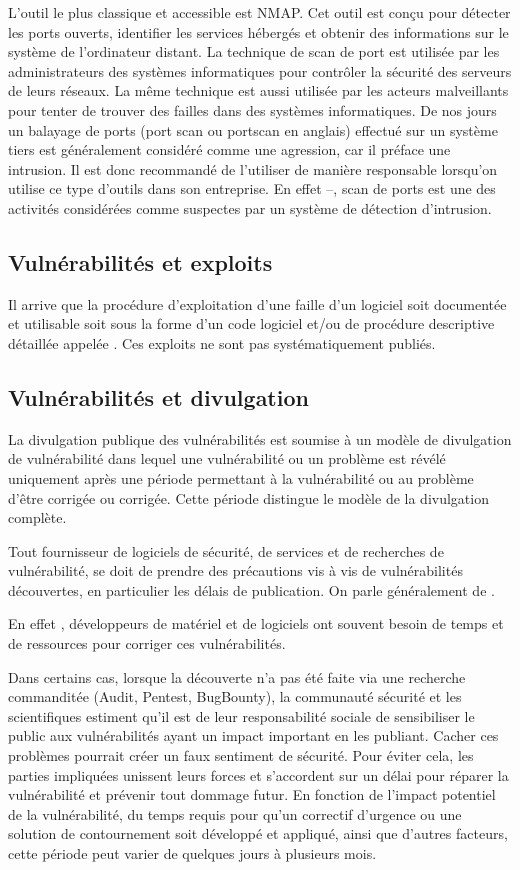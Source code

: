 L'outil le plus classique et accessible est NMAP.  Cet outil est conçu pour détecter les ports ouverts, identifier les services hébergés et obtenir des informations sur le système  de l'ordinateur distant. 
La technique de scan de port est utilisée par les administrateurs des systèmes informatiques pour contrôler la sécurité des serveurs de leurs réseaux. La même technique est aussi utilisée par les acteurs malveillants pour tenter de trouver des failles dans des systèmes informatiques. De nos jours un balayage de ports (port scan ou portscan en anglais) effectué sur un système tiers est généralement considéré comme une agression, car il préface une intrusion. Il est donc recommandé de l'utiliser de manière responsable lorsqu'on utilise ce type d'outils dans son entreprise. En effet --, 
scan de ports est une des activités considérées comme suspectes par un système de détection d'intrusion. 

\subsection{Vulnérabilités et exploits}

Il arrive que la procédure d'exploitation d'une faille d'un logiciel soit  documentée et utilisable soit sous la forme d'un code logiciel et/ou de procédure descriptive détaillée appelée . Ces exploits ne sont pas systématiquement publiés.

\subsection{Vulnérabilités et divulgation}

 La divulgation publique des vulnérabilités  est soumise à un modèle de divulgation de vulnérabilité dans lequel une vulnérabilité ou un problème est révélé uniquement après une période permettant à la vulnérabilité ou au problème d'être corrigée ou corrigée. Cette période distingue le modèle de la divulgation complète.
 
Tout fournisseur de logiciels de sécurité, de services et de recherches de vulnérabilité, se doit de prendre des précautions vis à vis de vulnérabilités découvertes, en particulier les délais de publication. On parle généralement de .

En effet , développeurs de matériel et de logiciels ont souvent besoin de temps et de ressources pour corriger ces vulnérabilités. 

Dans certains cas, lorsque la découverte n'a pas été faite via une recherche commanditée (Audit, Pentest, BugBounty), la communauté sécurité et les scientifiques  estiment qu’il est de leur responsabilité sociale de sensibiliser le public aux vulnérabilités ayant un impact important en les publiant. Cacher ces problèmes pourrait créer un faux sentiment de sécurité. Pour éviter cela, les parties impliquées unissent leurs forces et s’accordent sur un délai pour réparer la vulnérabilité et prévenir tout dommage futur. En fonction de l'impact potentiel de la vulnérabilité, du temps requis pour qu'un correctif d'urgence ou une solution de contournement soit développé et appliqué, ainsi que d'autres facteurs, cette période peut varier de quelques jours à plusieurs mois. 

